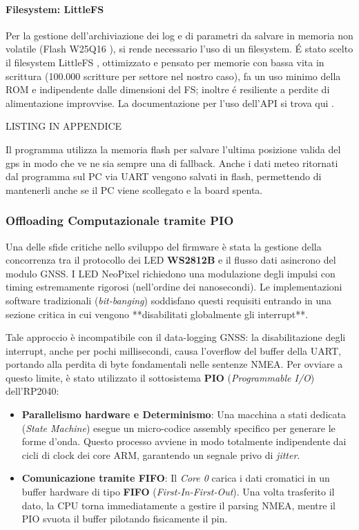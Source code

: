 \paragraph{Filesystem: LittleFS}

Per la gestione dell'archiviazione dei log e di parametri da salvare in memoria non volatile (Flash W25Q16 \cite{w25q128_ds}), si rende necessario l'uso di un filesystem. É stato scelto il filesystem LittleFS \cite{fastled_lib} \cite{littlefs_repo}, ottimizzato e pensato per memorie con bassa vita in scrittura (100.000 scritture per settore nel nostro caso), fa un uso minimo della ROM e indipendente dalle dimensioni del FS; inoltre é resiliente a perdite di alimentazione improvvise. La documentazione per l'uso dell'API si trova qui \cite{pico_arduino_core}. 

LISTING IN APPENDICE

Il programma utilizza la memoria flash per salvare l'ultima posizione valida del gps in modo che ve ne sia sempre una di fallback.
Anche i dati meteo ritornati dal programma sul PC via UART vengono salvati in flash, permettendo di mantenerli anche se il PC viene scollegato e la board spenta.




\subsubsection*{Offloading Computazionale tramite PIO}

Una delle sfide critiche nello sviluppo del firmware è stata la gestione della concorrenza tra il protocollo dei LED \textbf{WS2812B} e il flusso dati asincrono del modulo GNSS. I LED NeoPixel richiedono una modulazione degli impulsi con timing estremamente rigorosi (nell'ordine dei nanosecondi). Le implementazioni software tradizionali (\textit{bit-banging}) soddisfano questi requisiti entrando in una sezione critica in cui vengono **disabilitati globalmente gli interrupt**. 

Tale approccio è incompatibile con il data-logging GNSS: la disabilitazione degli interrupt, anche per pochi millisecondi, causa l'overflow del buffer della UART, portando alla perdita di byte fondamentali nelle sentenze NMEA. Per ovviare a questo limite, è stato utilizzato il sottosistema \textbf{PIO} (\textit{Programmable I/O}) dell'RP2040:

\begin{itemize}
    \item \textbf{Parallelismo hardware e Determinismo}: Una macchina a stati dedicata (\textit{State Machine}) esegue un micro-codice assembly specifico per generare le forme d'onda. Questo processo avviene in modo totalmente indipendente dai cicli di clock dei core ARM, garantendo un segnale privo di \textit{jitter}.
    \item \textbf{Comunicazione tramite FIFO}: Il \textit{Core 0} carica i dati cromatici in un buffer hardware di tipo \textbf{FIFO} (\textit{First-In-First-Out}). Una volta trasferito il dato, la CPU torna immediatamente a gestire il parsing NMEA, mentre il PIO svuota il buffer pilotando fisicamente il pin.
\end{itemize}




